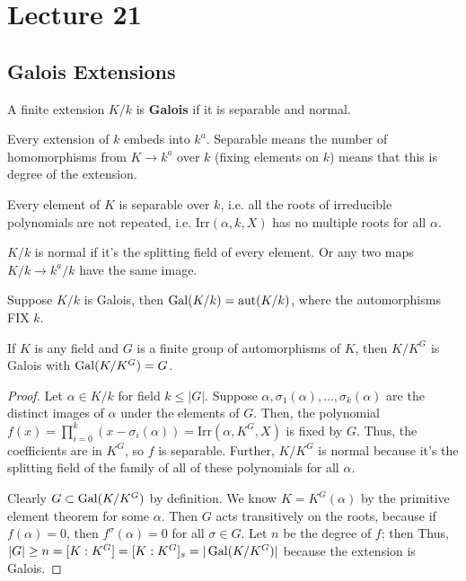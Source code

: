 \section{Lecture 21}
\subsection{Galois Extensions}
\begin{definition}
    A finite extension $K/k$ is \textbf{Galois} if it is separable and normal.
\end{definition}

Every extension of $k$ embeds into $k^a$. Separable means the number of homomorphisms
from $K \to k^a$ over $k$ (fixing elements on $k$) means that this is degree of the extension.

Every element of $K$ is separable over $k$, i.e. all the roots of irreducible
polynomials are not repeated, i.e. $\text{Irr}(\alpha, k, X)$ has no multiple roots for all $\alpha$.

$K/k$ is normal if it's the splitting field of every element. Or any two maps $K/k \to k^a/k$ have the same image.

\begin{definition}
    Suppose $K/k$ is Galois, then $\operatorname{Gal}(K/k) = \operatorname{aut}(K/k)$, where the automorphisms FIX $k$.
\end{definition}

\begin{theorem}
    If $K$ is any field and $G$ is a finite group of automorphisms of $K$,
    then $K/K^G$ is Galois with $\operatorname{Gal}(K/K^G) = G$.
    \begin{proof}
        Let $\alpha \in K/k$ for field $k \le |G|$. Suppose $\alpha, \sigma_1(\alpha), \dots, \sigma_k(\alpha)$
        are the distinct images of $\alpha$ under the elements of $G$. Then,
        the polynomial $f(x) = \prod_{i = 0}^{k}(x - \sigma_i(\alpha)) = \text{Irr}(\alpha, K^G, X)$ is fixed by $G$.
        Thus, the coefficients are in $K^G$, so $f$ is separable.
         Further, $K/K^G$
        is normal because it's the splitting field of the family of all of these polynomials for all $\alpha$.

        Clearly $G \subset \operatorname{Gal}(K/K^G)$ by definition.
        We know $K = K^G(\alpha)$ by the primitive element theorem for some $\alpha$. Then
        $G$ acts transitively on the roots, because if $f(\alpha) = 0$, then $f^\sigma(\alpha) = 0$
        for all $\sigma \in G$. Let $n$ be the degree of $f$; then
        Thus, $|G| \ge n = [K: K^G] = [K: K^G]_s = |\operatorname{Gal}(K/K^G)|$ because the extension is Galois.
    \end{proof}
\end{theorem}

